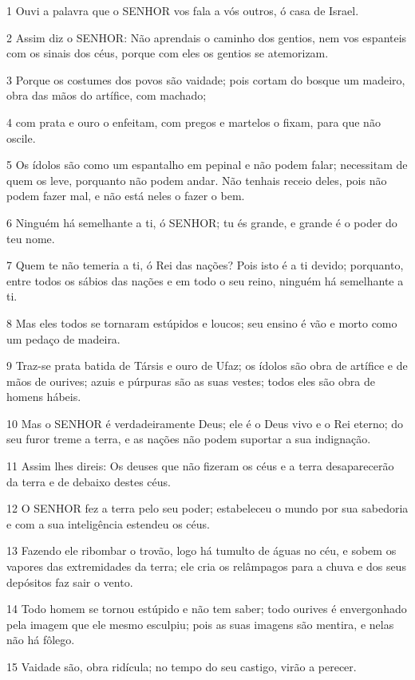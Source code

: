 \par 1 Ouvi a palavra que o SENHOR vos fala a vós outros, ó casa de Israel.
\par 2 Assim diz o SENHOR: Não aprendais o caminho dos gentios, nem vos espanteis com os sinais dos céus, porque com eles os gentios se atemorizam.
\par 3 Porque os costumes dos povos são vaidade; pois cortam do bosque um madeiro, obra das mãos do artífice, com machado;
\par 4 com prata e ouro o enfeitam, com pregos e martelos o fixam, para que não oscile.
\par 5 Os ídolos são como um espantalho em pepinal e não podem falar; necessitam de quem os leve, porquanto não podem andar. Não tenhais receio deles, pois não podem fazer mal, e não está neles o fazer o bem.
\par 6 Ninguém há semelhante a ti, ó SENHOR; tu és grande, e grande é o poder do teu nome.
\par 7 Quem te não temeria a ti, ó Rei das nações? Pois isto é a ti devido; porquanto, entre todos os sábios das nações e em todo o seu reino, ninguém há semelhante a ti.
\par 8 Mas eles todos se tornaram estúpidos e loucos; seu ensino é vão e morto como um pedaço de madeira.
\par 9 Traz-se prata batida de Társis e ouro de Ufaz; os ídolos são obra de artífice e de mãos de ourives; azuis e púrpuras são as suas vestes; todos eles são obra de homens hábeis.
\par 10 Mas o SENHOR é verdadeiramente Deus; ele é o Deus vivo e o Rei eterno; do seu furor treme a terra, e as nações não podem suportar a sua indignação.
\par 11 Assim lhes direis: Os deuses que não fizeram os céus e a terra desaparecerão da terra e de debaixo destes céus.
\par 12 O SENHOR fez a terra pelo seu poder; estabeleceu o mundo por sua sabedoria e com a sua inteligência estendeu os céus.
\par 13 Fazendo ele ribombar o trovão, logo há tumulto de águas no céu, e sobem os vapores das extremidades da terra; ele cria os relâmpagos para a chuva e dos seus depósitos faz sair o vento.
\par 14 Todo homem se tornou estúpido e não tem saber; todo ourives é envergonhado pela imagem que ele mesmo esculpiu; pois as suas imagens são mentira, e nelas não há fôlego.
\par 15 Vaidade são, obra ridícula; no tempo do seu castigo, virão a perecer.
